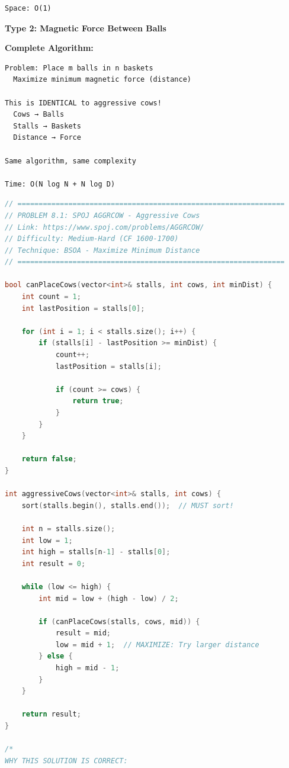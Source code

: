\documentclass[11pt,a4paper,oneside]{book}
\begin{document}
\begin{tcolorbox}[
    enhanced,breakable,
    colback=successgreen!10,
    colframe=successgreen,
    boxrule=1.5pt,
    arc=3mm,
    title=\textbf{Complete Aggressive Cows Algorithms}
]
\begin{verbatim}
Space: O(1)
\end{verbatim}

\textbf{Type 2: Magnetic Force Between Balls}

\textbf{Complete Algorithm:}
\begin{verbatim}
Problem: Place m balls in n baskets
  Maximize minimum magnetic force (distance)

This is IDENTICAL to aggressive cows!
  Cows → Balls
  Stalls → Baskets
  Distance → Force

Same algorithm, same complexity

Time: O(N log N + N log D)
\end{verbatim}
\end{tcolorbox}

\begin{lstlisting}[language=C++, caption=Complete Aggressive Cows Solutions]
// ===============================================================
// PROBLEM 8.1: SPOJ AGGRCOW - Aggressive Cows
// Link: https://www.spoj.com/problems/AGGRCOW/
// Difficulty: Medium-Hard (CF 1600-1700)
// Technique: BSOA - Maximize Minimum Distance
// ===============================================================

bool canPlaceCows(vector<int>& stalls, int cows, int minDist) {
    int count = 1;
    int lastPosition = stalls[0];
    
    for (int i = 1; i < stalls.size(); i++) {
        if (stalls[i] - lastPosition >= minDist) {
            count++;
            lastPosition = stalls[i];
            
            if (count >= cows) {
                return true;
            }
        }
    }
    
    return false;
}

int aggressiveCows(vector<int>& stalls, int cows) {
    sort(stalls.begin(), stalls.end());  // MUST sort!
    
    int n = stalls.size();
    int low = 1;
    int high = stalls[n-1] - stalls[0];
    int result = 0;
    
    while (low <= high) {
        int mid = low + (high - low) / 2;
        
        if (canPlaceCows(stalls, cows, mid)) {
            result = mid;
            low = mid + 1;  // MAXIMIZE: Try larger distance
        } else {
            high = mid - 1;
        }
    }
    
    return result;
}

/*
WHY THIS SOLUTION IS CORRECT:


\end{lstlisting}
\end{document}
